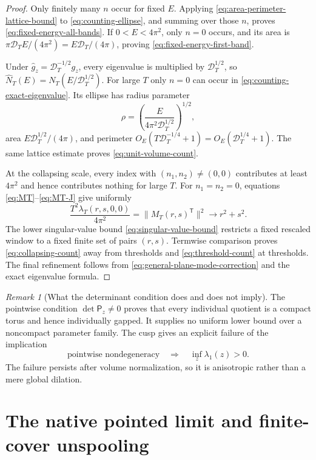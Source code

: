 \documentclass[11pt]{article}
\numberwithin{equation}{section}
\theoremstyle{definition}
\theoremstyle{remark}
\newtheorem{remark}[theorem]{Remark}
\begin{document}
\begin{proof}
Only finitely many $n$ occur for fixed $E$.  Applying
\eqref{eq:area-perimeter-lattice-bound} to
\eqref{eq:counting-ellipse}, and summing over those $n$, proves
\eqref{eq:fixed-energy-all-bands}.  If $0<E<4\pi^2$, only $n=0$ occurs, and
its area is
$\pi\mathcal D_T E/(4\pi^2)=E\mathcal D_T/(4\pi)$, proving
 \eqref{eq:fixed-energy-first-band}.

Under $\widehat g_z=\mathcal D_T^{-1/2}g_z$, every eigenvalue is multiplied
by $\mathcal D_T^{1/2}$, so
$\widehat N_T(E)=N_T(E/\mathcal D_T^{1/2})$.  For large $T$ only $n=0$
can occur in \eqref{eq:counting-exact-eigenvalue}.  Its ellipse has radius
parameter
\[
 \rho=\left(\frac{E}{4\pi^2\mathcal D_T^{1/2}}\right)^{1/2},
\]
area $E\mathcal D_T^{1/2}/(4\pi)$, and perimeter
$O_E(T\mathcal D_T^{-1/4}+1)=O_E(\mathcal D_T^{1/4}+1)$.
The same lattice estimate proves \eqref{eq:unit-volume-count}.

At the collapsing scale, every index with $(n_1,n_2)\ne(0,0)$ contributes
at least $4\pi^2$ and hence contributes nothing for large $T$.  For
$n_1=n_2=0$, equations \eqref{eq:MT}--\eqref{eq:MT-J} give uniformly
\[
 \frac{T^2\lambda_T(r,s,0,0)}{4\pi^2}
 =\|M_T(r,s)^{\mathsf T}\|^2\longrightarrow r^2+s^2.
\]
The lower singular-value bound \eqref{eq:singular-value-bound} restricts a
fixed rescaled window to a fixed finite set of pairs $(r,s)$.  Termwise
comparison proves \eqref{eq:collapsing-count} away from thresholds and
\eqref{eq:threshold-count} at thresholds.  The final refinement follows
from \eqref{eq:general-plane-mode-correction} and the exact eigenvalue
formula.
\end{proof}

\begin{remark}[What the determinant condition does and does not imply]
The pointwise condition $\det\mathsf P_z\ne0$ proves that every individual quotient is a compact torus and hence individually gapped.  It supplies no uniform lower bound over a noncompact parameter family.  The cusp gives an explicit failure of the implication
\[
 \text{pointwise nondegeneracy}\quad\Longrightarrow\quad
 \inf_z\lambda_1(z)>0.
\]
The failure persists after volume normalization, so it is anisotropic rather than a mere global dilation.
\end{remark}

\section{The native pointed limit and finite-cover unspooling}
\end{document}
